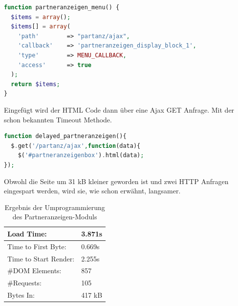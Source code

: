 \begin{minipage}[t]{1\textwidth}
\begin{lstlisting}[language=php,label=Ajax - hook,caption=Ajax - hook]
function partneranzeigen_menu() {
  $items = array();
  $items[] = array(
    'path'        => "partanz/ajax",
    'callback'    => 'partneranzeigen_display_block_1',
    'type'        => MENU_CALLBACK,
    'access'      => true
  );
  return $items;
}
\end{lstlisting}
\end{minipage}

Eingefügt wird der HTML Code dann über eine Ajax GET Anfrage. Mit der schon bekannten Timeout Methode.

\begin{minipage}[t]{1\textwidth}
\begin{lstlisting}[language=php,label=Ajax - GET,caption=Ajax - GET]
function delayed_partneranzeigen(){
  $.get('/partanz/ajax',function(data){
    $('#partneranzeigenbox').html(data);
});
\end{lstlisting}
\end{minipage}
Obwohl die Seite um 31 kB kleiner geworden ist und zwei HTTP Anfragen eingespart werden, wird sie, wie schon erwähnt, langsamer.
\begin{table}[!ht]
\centering
\caption{Ergebnis der Umprogrammierung des Partneranzeigen-Moduls}
    \begin{tabular}{ | p{3cm} | p{1.5cm} | }
    \hline
    Load Time: 			& 3.871s 	\\ \hline
    Time to First Byte:		& 0.669s  	\\ \hline
    Time to Start Render:	& 2.255s	\\ \hline
    \#DOM Elements:		& 857 		\\ \hline
    \#Requests:			& 105 		\\ \hline
    Bytes In:			& 417 kB 	\\ \hline
    \hline
    \end{tabular}
\end{table}

